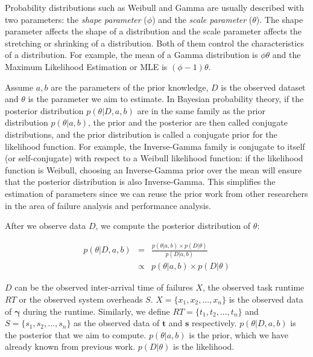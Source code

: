 Probability distributions such as Weibull and Gamma are usually described with two parameters: the \emph{shape parameter} ($\phi$) and the \emph{scale parameter} ($\theta$). The shape parameter affects the shape of a distribution and the scale parameter affects the stretching or shrinking of a distribution. Both of them control the characteristics of a distribution. For example, the mean of a Gamma distribution is $\phi\theta$ and the Maximum Likelihood Estimation or MLE is $(\phi-1)\theta$. 

Assume $a,b$ are the parameters of the prior knowledge, $D$ is the observed dataset and $\theta$ is the parameter we aim to estimate. In Bayesian probability theory, if the posterior distribution $p(\theta|D, a, b)$ are in the same family as the prior distribution $p(\theta|a, b)$, the prior and the posterior are then called conjugate distributions, and the prior distribution is called a conjugate prior for the likelihood function. For example, the Inverse-Gamma family is conjugate to itself (or self-conjugate) with respect to a Weibull likelihood function: if the likelihood function is Weibull, choosing an Inverse-Gamma prior over the mean will ensure that the posterior distribution is also Inverse-Gamma. This simplifies the estimation of parameters since we can reuse the prior work from other researchers \cite{Schroeder2006, Iosup2008, Sun2003, Chen2011} in the area of failure analysis and performance analysis. 

After we observe data $D$, we compute the posterior distribution of $\theta$:

\begin{eqnarray*}
	\displaystyle  
	p(\theta|D, a, b)&=&\frac{p(\theta|a, b)\times p(D|\theta)}{p(D|a, b)}\nonumber  \\
	&\propto&p(\theta|a, b)\times p(D|\theta)\nonumber 
\end{eqnarray*}

$D$ can be the observed inter-arrival time of failures $X$, the observed task runtime $RT$ or the observed system overheads $S$. 
$X=\{x_1, x_2, ..., x_n\}$ is the observed data of $\bm\gamma$ during the runtime. Similarly, we define $RT=\{t_1, t_2, ..., t_n\}$ and $S=\{s_1, s_2, ..., s_n\}$ as the observed data of $\bm t$ and $\bm s$ respectively. $p(\theta|D,a, b)$ is the posterior that we aim to compute. $p(\theta|a, b)$ is the prior, which we have already known from previous work. $p(D|\theta)$ is the likelihood. 



